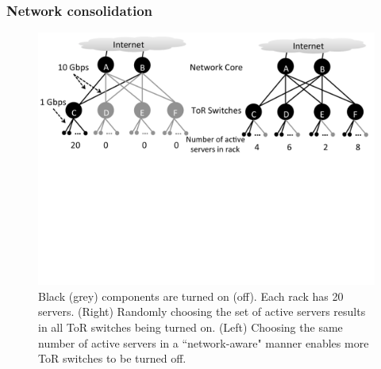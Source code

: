 




\subsubsection{Network consolidation}
\label{sec:node-selection}

\begin{figure}[t]
\centering
\includegraphics[scale=0.33]{figures/min-bw-v2.pdf}
\vspace{-1.4in}
\caption{Black (grey) components are turned on (off). Each rack has 20 servers. (Right) Randomly choosing the set of active servers results in all ToR switches being turned on. (Left) Choosing the same number of active servers in a ``network-aware" manner enables more ToR switches to be turned off.}
\label{fig:topo}
\end{figure}

